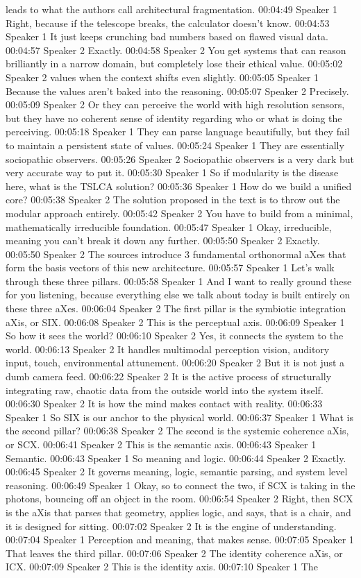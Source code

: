 leads to what the authors call architectural fragmentation. 00:04:49 Speaker 1 Right, because if the telescope breaks, the calculator doesn't know. 00:04:53 Speaker 1 It just keeps crunching bad numbers based on flawed visual data. 00:04:57 Speaker 2 Exactly. 00:04:58 Speaker 2 You get systems that can reason brilliantly in a narrow domain, but completely lose their ethical value. 00:05:02 Speaker 2 values when the context shifts even slightly. 00:05:05 Speaker 1 Because the values aren't baked into the reasoning. 00:05:07 Speaker 2 Precisely. 00:05:09 Speaker 2 Or they can perceive the world with high resolution sensors, but they have no coherent sense of identity regarding who or what is doing the perceiving. 00:05:18 Speaker 1 They can parse language beautifully, but they fail to maintain a persistent state of values. 00:05:24 Speaker 1 They are essentially sociopathic observers. 00:05:26 Speaker 2 Sociopathic observers is a very dark but very accurate way to put it. 00:05:30 Speaker 1 So if modularity is the disease here, what is the TSLCA solution? 00:05:36 Speaker 1 How do we build a unified core? 00:05:38 Speaker 2 The solution proposed in the text is to throw out the modular approach entirely. 00:05:42 Speaker 2 You have to build from a minimal, mathematically irreducible foundation. 00:05:47 Speaker 1 Okay, irreducible, meaning you can't break it down any further. 00:05:50 Speaker 2 Exactly. 00:05:50 Speaker 2 The sources introduce 3 fundamental orthonormal aXes that form the basis vectors of this new architecture. 00:05:57 Speaker 1 Let's walk through these three pillars. 00:05:58 Speaker 1 And I want to really ground these for you listening, because everything else we talk about today is built entirely on these three aXes. 00:06:04 Speaker 2 The first pillar is the symbiotic integration aXis, or SIX. 00:06:08 Speaker 2 This is the perceptual axis. 00:06:09 Speaker 1 So how it sees the world? 00:06:10 Speaker 2 Yes, it connects the system to the world. 00:06:13 Speaker 2 It handles multimodal perception vision, auditory input, touch, environmental attunement. 00:06:20 Speaker 2 But it is not just a dumb camera feed. 00:06:22 Speaker 2 It is the active process of structurally integrating raw, chaotic data from the outside world into the system itself. 00:06:30 Speaker 2 It is how the mind makes contact with reality. 00:06:33 Speaker 1 So SIX is our anchor to the physical world. 00:06:37 Speaker 1 What is the second pillar? 00:06:38 Speaker 2 The second is the systemic coherence aXis, or SCX. 00:06:41 Speaker 2 This is the semantic axis. 00:06:43 Speaker 1 Semantic. 00:06:43 Speaker 1 So meaning and logic. 00:06:44 Speaker 2 Exactly. 00:06:45 Speaker 2 It governs meaning, logic, semantic parsing, and system level reasoning. 00:06:49 Speaker 1 Okay, so to connect the two, if SCX is taking in the photons, bouncing off an object in the room. 00:06:54 Speaker 2 Right, then SCX is the aXis that parses that geometry, applies logic, and says, that is a chair, and it is designed for sitting. 00:07:02 Speaker 2 It is the engine of understanding. 00:07:04 Speaker 1 Perception and meaning, that makes sense. 00:07:05 Speaker 1 That leaves the third pillar. 00:07:06 Speaker 2 The identity coherence aXis, or ICX. 00:07:09 Speaker 2 This is the identity axis. 00:07:10 Speaker 1 The 